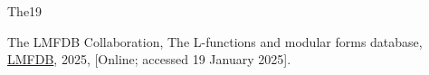 \documentclass{amsart}
\newcommand{\ZZ}{\mathbf{Z}}
\numberwithin{equation}{section}
\begin{document}
\begin{thebibliography}{{The}19}

























The LMFDB Collaboration, The L-functions and modular forms database, \href{https://www.lmfdb.org}{LMFDB}, 2025, [Online; accessed 19 January 2025].


\end{thebibliography}
\end{document}
